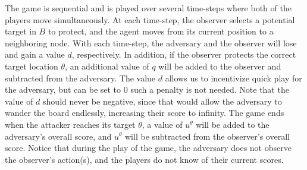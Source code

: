 The game is sequential and is played over several time-steps 
where both of the players move simultaneously. 
At each time-step, the observer selects a potential target in $B$ to protect, 
and the agent moves from its current position to a neighboring node.
With each time-step, the adversary and the observer will lose and gain a value $d$, respectively.
In addition, if the observer protects the correct target location $\theta$,
an additional value of $q$ will be added to the observer 
and subtracted from the adversary. The value $d$ allows us to incentivize quick play for the adversary, but can be set to $0$ such a penalty is not needed. Note that the value of $d$ should never be negative, since that would allow the adversary to wander the board endlessly, increasing their score to infinity.
The game ends when the attacker reaches its target $\theta$, 
a value of $u^{\theta}$ will be added to the adversary's overall score, and $u^{\theta}$ will be subtracted 
from the observer's overall score. 
Notice that during the play of the game, the adversary does not observe 
the observer's action(s), and the players do not know of their current scores. 

